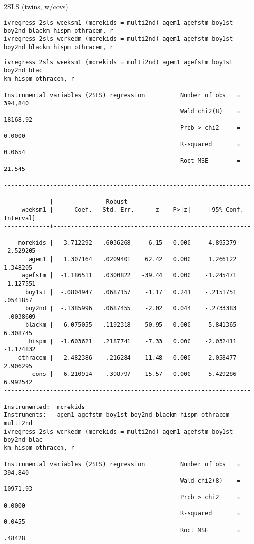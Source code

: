 \documentclass[cache=false]{article}
\begin{document}
2SLS (twins, w/covs)
\begin{verbatim}
ivregress 2sls weeksm1 (morekids = multi2nd) agem1 agefstm boy1st boy2nd blackm hispm othracem, r
ivregress 2sls workedm (morekids = multi2nd) agem1 agefstm boy1st boy2nd blackm hispm othracem, r
\end{verbatim}

\begin{verbatim}
ivregress 2sls weeksm1 (morekids = multi2nd) agem1 agefstm boy1st boy2nd blac
km hispm othracem, r

Instrumental variables (2SLS) regression          Number of obs   =    394,840
                                                  Wald chi2(8)    =   18168.92
                                                  Prob > chi2     =     0.0000
                                                  R-squared       =     0.0654
                                                  Root MSE        =     21.545

------------------------------------------------------------------------------
             |               Robust
     weeksm1 |      Coef.   Std. Err.      z    P>|z|     [95% Conf. Interval]
-------------+----------------------------------------------------------------
    morekids |  -3.712292   .6036268    -6.15   0.000    -4.895379   -2.529205
       agem1 |   1.307164   .0209401    62.42   0.000     1.266122    1.348205
     agefstm |  -1.186511   .0300822   -39.44   0.000    -1.245471   -1.127551
      boy1st |  -.0804947   .0687157    -1.17   0.241    -.2151751    .0541857
      boy2nd |  -.1385996   .0687455    -2.02   0.044    -.2733383   -.0038609
      blackm |   6.075055   .1192318    50.95   0.000     5.841365    6.308745
       hispm |  -1.603621   .2187741    -7.33   0.000    -2.032411   -1.174832
    othracem |   2.482386    .216284    11.48   0.000     2.058477    2.906295
       _cons |   6.210914    .398797    15.57   0.000     5.429286    6.992542
------------------------------------------------------------------------------
Instrumented:  morekids
Instruments:   agem1 agefstm boy1st boy2nd blackm hispm othracem multi2nd
ivregress 2sls workedm (morekids = multi2nd) agem1 agefstm boy1st boy2nd blac
km hispm othracem, r

Instrumental variables (2SLS) regression          Number of obs   =    394,840
                                                  Wald chi2(8)    =   10971.93
                                                  Prob > chi2     =     0.0000
                                                  R-squared       =     0.0455
                                                  Root MSE        =     .48428


\end{verbatim}
\end{document}

